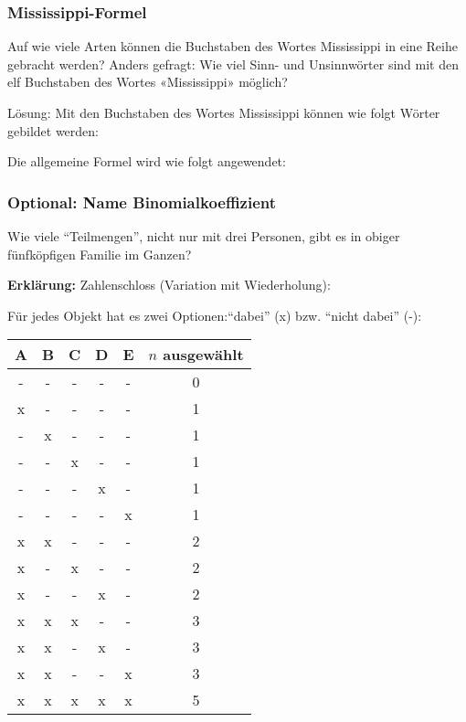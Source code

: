 \subsubsection{Mississippi-Formel}

Auf wie viele Arten können die Buchstaben des Wortes Mississippi in
eine Reihe gebracht werden? Anders gefragt: Wie viel Sinn- und
Unsinnwörter sind mit den elf Buchstaben des Wortes «Mississippi»
möglich?

Lösung: Mit den Buchstaben des Wortes
{\color{red}M}{\color{blue}i}{\color{orange}ss}{\color{blue}i}{\color{orange}ss}{\color{blue}i}{\color{violet}pp}{\color{blue}i}
können wie folgt Wörter gebildet werden:


Die allgemeine Formel wird wie folgt angewendet:

\subsubsection{Optional: Name Binomialkoeffizient}

 Wie viele ``Teilmengen'', nicht nur mit drei Personen, gibt es in obiger
  fünfköpfigen Familie im Ganzen?

    

\textbf{Erklärung:} Zahlenschloss (Variation mit Wiederholung):

Für jedes Objekt hat es zwei Optionen:``dabei'' (x) bzw. ``nicht dabei'' (-):

\begin{tabular}{ccccc|c}
A&B&C&D&E&$n$ ausgewählt \\\hline
-&-&-&-&-&0\\
x&-&-&-&-&1\\
-&x&-&-&-&1\\
-&-&x&-&-&1\\
-&-&-&x&-&1\\
-&-&-&-&x&1\\
x&x&-&-&-&2\\
x&-&x&-&-&2\\
x&-&-&x&-&2\\
\hline
\hline
x&x&x&-&-&3\\
x&x&-&x&-&3\\
x&x&-&-&x&3\\
\hline \hline
x&x&x&x&x&5\\\hline
\end{tabular}

